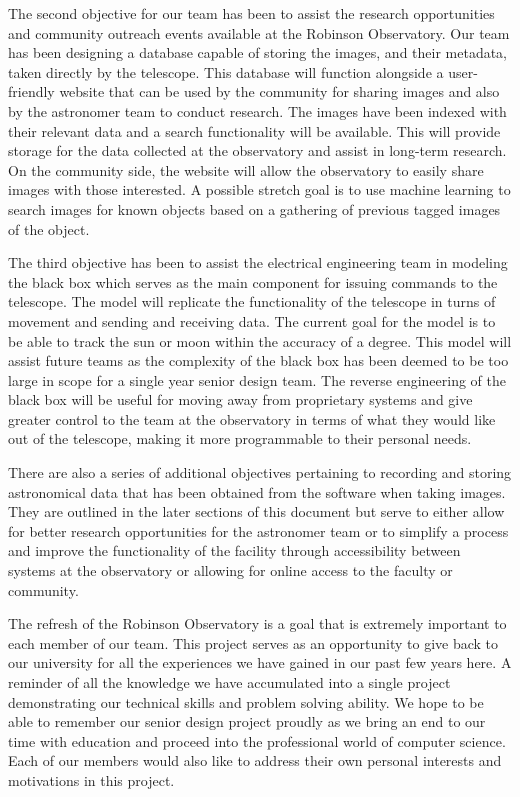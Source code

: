 \documentclass[12pt]{article}
\begin{document}
The second objective for our team has been to assist the research opportunities and community outreach events available at the Robinson Observatory.  Our team has been designing a database capable of storing the images, and their metadata, taken directly by the telescope.  This database will function alongside a user-friendly website that can be used by the community for sharing images and also by the astronomer team to conduct research.  The images have been indexed with their relevant data and a search functionality will be available.  This will provide storage for the data collected at the observatory and assist in long-term research.  On the community side, the website will allow the observatory to easily share images with those interested.  A possible stretch goal is to use machine learning to search images for known objects based on a gathering of previous tagged images of the object.

The third objective has been to assist the electrical engineering team in modeling the black box which serves as the main component for issuing commands to the telescope.  The model will replicate the functionality of the telescope in turns of movement and sending and receiving data.  The current goal for the model is to be able to track the sun or moon within the accuracy of a degree.  This model will assist future teams as the complexity of the black box has been deemed to be too large in scope for a single year senior design team.  The reverse engineering of the black box will be useful for moving away from proprietary systems and give greater control to the team at the observatory in terms of what they would like out of the telescope, making it more programmable to their personal needs.

There are also a series of additional objectives pertaining to recording and storing astronomical data that has been obtained from the software when taking images.  They are outlined in the later sections of this document but serve to either allow for better research opportunities for the astronomer team or to simplify a process and improve the functionality of the facility through accessibility between systems at the observatory or allowing for online access to the faculty or community.

The refresh of the Robinson Observatory is a goal that is extremely important to each member of our team.  This project serves as an opportunity to give back to our university for all the experiences we have gained in our past few years here.  A reminder of all the knowledge we have accumulated into a single project demonstrating our technical skills and problem solving ability.  We hope to be able to remember our senior design project proudly as we bring an end to our time with education and proceed into the professional world of computer science.  Each of our members would also like to address their own personal interests and motivations in this project.
\end{document}
